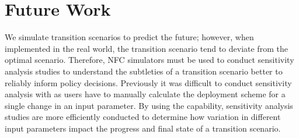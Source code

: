 \section{Future Work}
We simulate transition scenarios to predict the future; 
however, when implemented in the real world, the transition 
scenario tend to deviate from the optimal scenario.
Therefore, \gls{NFC} simulators must be used to conduct
sensitivity analysis studies to understand the subtleties of 
a transition scenario better to reliably inform policy decisions.
Previously it was difficult to conduct sensitivity analysis with \Cyclus 
as users have to manually calculate the deployment scheme for a 
single change in an input parameter. 
By using the \deploy capability,
sensitivity analysis studies are more efficiently 
conducted to determine how variation in different 
input parameters impact the progress and final state of 
a transition scenario.